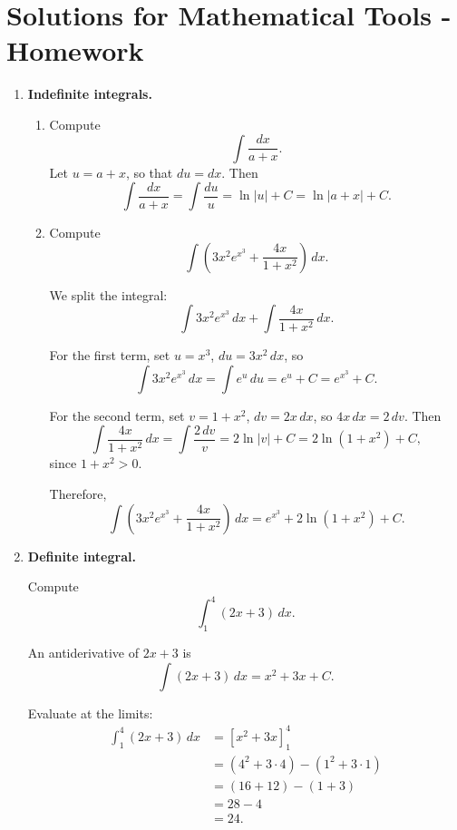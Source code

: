 \documentclass[../main.tex]{subfiles}
\begin{document}
\maketitle

\section*{Solutions for Mathematical Tools - Homework}

\begin{enumerate}

\item \textbf{Indefinite integrals.}

\begin{enumerate}
    \item Compute
    \[
      \int \frac{dx}{a+x}.
    \]
    Let $u = a+x$, so that $du = dx$. Then
    \[
      \int \frac{dx}{a+x}
      = \int \frac{du}{u}
      = \ln|u| + C
      = \ln|a+x| + C.
    \]

    \item Compute
    \[
      \int \left(3x^2 e^{x^3} + \frac{4x}{1+x^2}\right) \, dx.
    \]

    We split the integral:
    \[
      \int 3x^2 e^{x^3} \, dx + \int \frac{4x}{1+x^2} \, dx.
    \]

    For the first term, set $u = x^3$, $du = 3x^2 \, dx$, so
    \[
      \int 3x^2 e^{x^3} \, dx = \int e^u \, du = e^u + C = e^{x^3} + C.
    \]

    For the second term, set $v = 1+x^2$, $dv = 2x \, dx$, so $4x \, dx = 2\, dv$. Then
    \[
      \int \frac{4x}{1+x^2} \, dx
      = \int \frac{2\, dv}{v}
      = 2 \ln|v| + C
      = 2 \ln(1+x^2) + C,
    \]
    since $1+x^2>0$.

    Therefore,
    \[
      \int \left(3x^2 e^{x^3} + \frac{4x}{1+x^2}\right) \, dx
      = e^{x^3} + 2 \ln(1+x^2) + C.
    \]

\end{enumerate}


\item \textbf{Definite integral.}

Compute
\[
  \int_{1}^{4} (2x+3)\,dx.
\]

An antiderivative of $2x+3$ is
\[
  \int (2x+3)\,dx = x^2 + 3x + C.
\]

Evaluate at the limits:
\begin{align*}
\int_{1}^{4} (2x+3)\,dx
&= \left[ x^2 + 3x \right]_{1}^{4} \\
&= \left(4^2 + 3\cdot 4\right) - \left(1^2 + 3\cdot 1\right) \\
&= (16+12) - (1+3) \\
&= 28 - 4 \\
&= 24.
\end{align*}


\end{enumerate}
\end{document}
